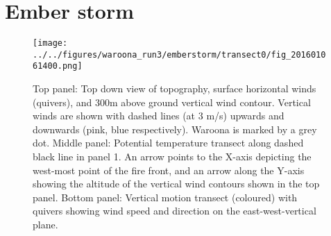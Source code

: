 \section{Ember storm}
  \label{emberstorm}


  \begin{figure}
    \texttt{[image: ../../figures/waroona\_run3/emberstorm/transect0/fig\_201601061400.png]}
    \caption{%
      Top panel: Top down view of topography, surface horizontal winds (quivers), and 300m above ground vertical wind contour. Vertical winds are shown with dashed lines (at 3 m/s) upwards and downwards (pink, blue respectively). 
      Waroona is marked by a grey dot.
      Middle panel: Potential temperature transect along dashed black line in panel 1. An arrow points to the X-axis depicting the west-most point of the fire front, and an arrow along the Y-axis showing the altitude of the vertical wind contours shown in the top panel.
      Bottom panel: Vertical motion transect (coloured) with quivers showing wind speed and direction on the east-west-vertical plane.}
    \label{fig:emberstorm:jump}
  \end{figure}